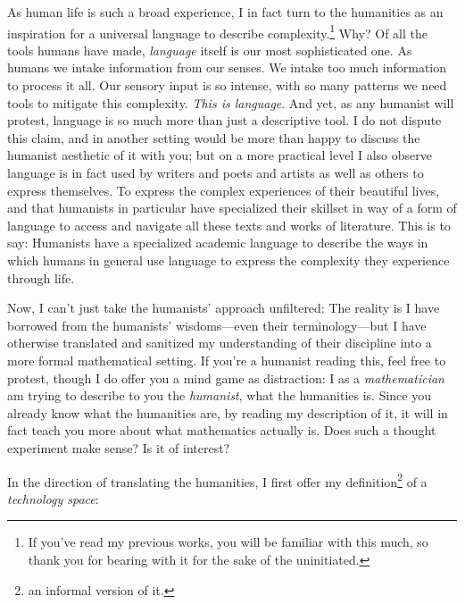 \documentclass[twoside]{article}
\begin{document}
As human life is such a broad experience, I in fact turn to the humanities as an inspiration for a universal language to describe
complexity.\footnote{If you've read my previous works, you will be familiar with this much, so thank you for bearing with it for
the sake of the uninitiated.} Why? Of all the tools humans have made, \emph{language} itself is our most sophisticated one.
As humans we intake information from our senses. We intake too much information to process it all. Our sensory input is so intense,
with so many patterns we need tools to mitigate this complexity. \emph{This is language}. And yet, as any humanist will protest,
language is so much more than just a descriptive tool. I do not dispute this claim, and in another setting would be more than happy
to discuss the humanist aesthetic of it with you; but on a more practical level I also observe language is in fact used by writers
and poets and artists as well as others to express themselves. To express the complex experiences of their beautiful lives,
and that humanists in particular have specialized their skillset in way of a form of language to access and navigate all these
texts and works of literature. This is to say: Humanists have a specialized academic language to describe the ways in which humans
in general use language to express the complexity they experience through life.

Now, I can't just take the humanists' approach unfiltered: The reality is I have borrowed from the humanists'
wisdoms---even their terminology---but I have otherwise translated and sanitized my understanding of their discipline into
a more formal mathematical setting. If you're a humanist reading this, feel free to protest, though I do offer you a mind game
as distraction: I as a \emph{mathematician} am trying to describe to you the \emph{humanist}, what the humanities is. Since you
already know what the humanities are, by reading my description of it, it will in fact teach you more about what mathematics
actually is.  Does such a thought experiment make sense? Is it of interest?

\newpage

In the direction of translating the humanities, I first offer my
definition\footnote{an informal version of it.} of a \emph{technology space}:
\end{document}
